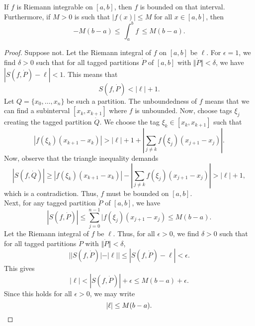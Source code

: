 \documentclass[11pt]{article}
\theoremstyle{definition}
\theoremstyle{remark}
\numberwithin{equation}{module}
\begin{document}
    \begin{theorem}
        If $f$ is Riemann integrable on $[a, b]$, then $f$ is bounded on that interval.
        Furthermore, if $M > 0$ is such that $|f(x)| \leq M$ for all $x \in [a, b]$,
        then \[
            -M(b - a) \leq\, \int_a^b f \,\leq M(b - a).
        \] 
    \end{theorem}
    \begin{proof}
        Suppose not. Let the Riemann integral of $f$ on $[a, b]$ be $\ell$. For
        $\epsilon = 1$, we find $\delta > 0$ such that for all tagged partitions
        $\dot{P}$ of $[a, b]$ with $\Vert\dot{P}\Vert < \delta$, we have $|S(f,
        \dot{P}) - \ell| < 1$. This means that \[
            S(f, \dot{P}) < |\ell| + 1.
        \] Let $Q = \{x_0, \dots, x_n\}$ be such a partition. The unboundedness of
        $f$ means that we can find a subinterval $[x_k, x_{k + 1}]$ where $f$ is
        unbounded. Now, choose tags $\xi_j$ creating the tagged partition $\dot{Q}$.
        We choose the tag $\xi_k \in [x_k, x_{k + 1}]$ such
        that \[
            |f(\xi_k)(x_{k + 1} - x_k)| > |\ell| + 1 + |\sum_{j \neq k}
            f(\xi_j)(x_{j + 1} - x_j)|.
        \] Now, observe that the triangle inequality demands \[
            |S(f, \dot{Q})| \geq |f(\xi_{k})(x_{k + 1} - x_k)| - |\sum_{j \neq k}
            f(\xi_j)(x_{j + 1} - x_j)| > |\ell| + 1,
        \] which is a contradiction. Thus, $f$ must be bounded on $[a, b]$. \\
        
        \noindent
        Next, for any tagged partition $\dot{P}$ of $[a, b]$, we have \[
            |S(f, \dot{P})| \leq \sum_{j = 0}^{n - 1}|f(\xi_j)(x_{j + 1} - x_j) \leq
            M(b - a).
        \] Let the Riemann integral of $f$ be $\ell$.
        Thus, for all $\epsilon > 0$, we find $\delta > 0$ such that for all
        tagged partitions $\dot{P}$ with $\Vert\dot{P}\Vert < \delta$, \[
            | |S(f, \dot{P})| - |\ell| | \leq |S(f, \dot{P}) - \ell| < \epsilon.
        \] This gives \[
            |\ell| < |S(f, \dot{P})| + \epsilon \leq M(b - a) + \epsilon.
        \] Since this holds for all $\epsilon > 0$, we may write \[
            |\ell| \leq M(b - a). \qedhere
        \] 
    \end{proof}
\end{document}
